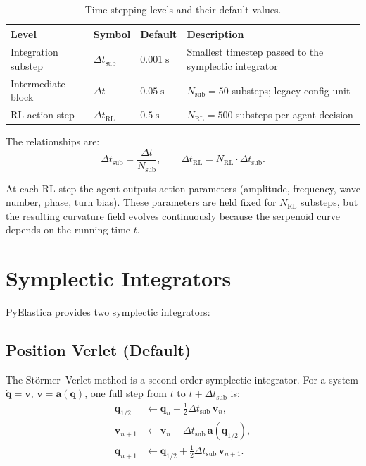 \documentclass[11pt]{article}
\newcommand{\vect}[1]{\mathbf{#1}}
\newcommand{\dtrl}{\Delta t_{\mathrm{RL}}}
\newcommand{\dtsub}{\Delta t_{\mathrm{sub}}}
\newcommand{\Nsub}{N_{\mathrm{sub}}}
\newcommand{\Nrl}{N_{\mathrm{RL}}}
\begin{document}
\begin{table}[H]
\centering
\caption{Time-stepping levels and their default values.}
\label{tab:timesteps}
\renewcommand{\arraystretch}{1.3}
\begin{tabular}{@{}llll@{}}
\toprule
\textbf{Level} & \textbf{Symbol} & \textbf{Default} & \textbf{Description} \\
\midrule
Integration substep & $\dtsub$ & $0.001\;\mathrm{s}$ &
  Smallest timestep passed to the symplectic integrator \\
Intermediate block & $\Delta t$ & $0.05\;\mathrm{s}$ &
  $\Nsub = 50$ substeps; legacy config unit \\
RL action step & $\dtrl$ & $0.5\;\mathrm{s}$ &
  $\Nrl = 500$ substeps per agent decision \\
\bottomrule
\end{tabular}
\end{table}

The relationships are:
\begin{equation}
  \dtsub = \frac{\Delta t}{\Nsub}, \qquad
  \dtrl  = \Nrl \cdot \dtsub.
  \label{eq:dt-relations}
\end{equation}

At each RL step the agent outputs action parameters (amplitude, frequency,
wave number, phase, turn bias).  These parameters are held fixed for $\Nrl$
substeps, but the resulting curvature field evolves continuously because the
serpenoid curve depends on the running time $t$.

\section{Symplectic Integrators}
\label{sec:integrators}

PyElastica provides two symplectic integrators:

\subsection{Position Verlet (Default)}
\label{sec:position-verlet}

The St\"ormer--Verlet method is a second-order symplectic integrator.
For a system $\dot{\vect{q}} = \vect{v}$, $\dot{\vect{v}} = \vect{a}(\vect{q})$,
one full step from $t$ to $t + \dtsub$ is:
\begin{align}
  \vect{q}_{1/2} &\gets \vect{q}_n + \tfrac{1}{2}\dtsub\,\vect{v}_n, \label{eq:pv1} \\
  \vect{v}_{n+1} &\gets \vect{v}_n + \dtsub\,\vect{a}(\vect{q}_{1/2}), \label{eq:pv2} \\
  \vect{q}_{n+1} &\gets \vect{q}_{1/2} + \tfrac{1}{2}\dtsub\,\vect{v}_{n+1}. \label{eq:pv3}
\end{align}
\end{document}
